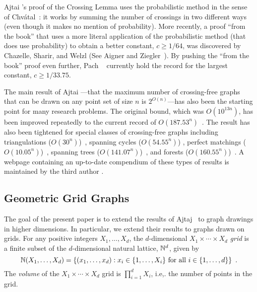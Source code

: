 \documentclass[12pt]{article}
\begin{document}
Ajtai \etal's proof of the Crossing Lemma uses the probabilistic method
in the sense of Chv\'atal~\cite{chvatal:hypergraphs}: it works by summing
the number of crossings in two different ways (even though it makes no
mention of probability).  More recently, a proof ``from the book'' that
uses a more literal application of the probabilistic method (that does
use probability) to obtain a better constant, $c\ge 1/64$, was discovered
by Chazelle, Sharir, and Welzl (See Aigner and Ziegler~\cite[Chapter~30,
Theorem~4]{aigner.ziegler:proofs}).  By pushing the ``from the book''
proof even further, Pach \etal~\cite{pach.radoicic.ea:improving} currently
hold the record for the largest constant, $c\ge 1/33.75$.

The main result of Ajtai \etal---that the maximum number
of crossing-free graphs that can be drawn on any point set of
size $n$ is $2^{O(n)}$---has also been the starting point
for many research problems. The original bound, which was
$O(10^{13n})$, has been improved repeatedly to the current record of
$O(187.53^n)$~\cite{sharir.sheffer:counting*1}.  The result has also
been tightened for special classes of crossing-free graphs including
triangulations ($O(30^n)$)~\cite{sharir.sheffer:counting}, spanning
cycles ($O(54.55^n)$) \cite{sharir.sheffer.ea:counting}, perfect
matchings ($O(10.05^n)$)~\cite{sharir.welzl:on}, spanning trees
($O(141.07^n)$)~\cite{hoffmann.sharir.ea:counting}, and forests
($O(160.55^n)$)~\cite{hoffmann.sharir.ea:counting,sharir.sheffer:counting}.
A webpage containing an up-to-date compendium of these types of results
is maintained by the third author \cite{sheffer:numbers}.

\subsection{Geometric Grid Graphs}

The goal of the present paper is to extend the results of Ajtaj \etal\
to graph drawings in higher dimensions.  In particular, we extend
their results to graphs drawn on grids.  For any positive integers
$X_1,\ldots,X_d$, the $d$-dimensional \emph{$X_1\times\cdots\times X_d$
grid} is a finite subset of the $d$-dimensional natural lattice, $\mathbb{N}^d$,
given by
\[  \mathbb{N}(X_1,\ldots,X_d) = \{(x_1,\ldots,x_d): 
      \mbox{$x_i\in\{1,\ldots,X_i\}$ for all $i\in\{1,\ldots,d\}$}\}
	\enspace .\]
The \emph{volume} of the $X_1\times\cdots\times X_d$ grid is
$\prod_{i=1}^d X_i$, i.e,. the number of points in the grid.
\end{document}
